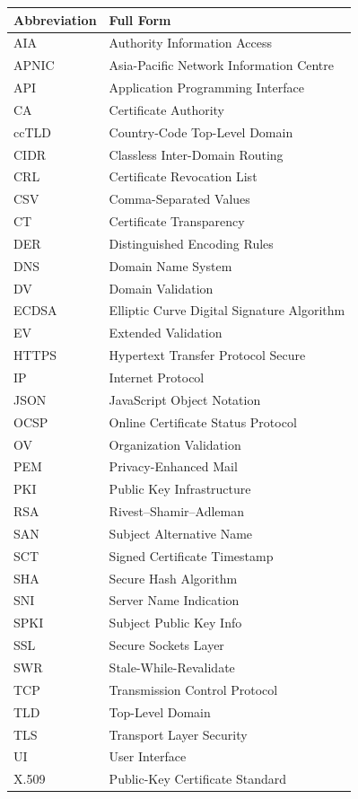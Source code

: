\clearpage
{}
{}

\begingroup
\singlespacing
\setlength{\LTpre}{0pt}
\setlength{\LTpost}{0pt}
\renewcommand{\arraystretch}{1.25}
\begin{longtable}{@{}p{}p{}@{}}
\toprule
\textbf{Abbreviation} & \textbf{Full Form} \\
\midrule
AIA & Authority Information Access \\
APNIC & Asia-Pacific Network Information Centre \\
API & Application Programming Interface \\
CA & Certificate Authority \\
ccTLD & Country-Code Top-Level Domain \\
CIDR & Classless Inter-Domain Routing \\
CRL & Certificate Revocation List \\
CSV & Comma-Separated Values \\
CT & Certificate Transparency \\
DER & Distinguished Encoding Rules \\
DNS & Domain Name System \\
DV & Domain Validation \\
ECDSA & Elliptic Curve Digital Signature Algorithm \\
EV & Extended Validation \\
HTTPS & Hypertext Transfer Protocol Secure \\
IP & Internet Protocol \\
JSON & JavaScript Object Notation \\
OCSP & Online Certificate Status Protocol \\
OV & Organization Validation \\
PEM & Privacy-Enhanced Mail \\
PKI & Public Key Infrastructure \\
RSA & Rivest--Shamir--Adleman \\
SAN & Subject Alternative Name \\
SCT & Signed Certificate Timestamp \\
SHA & Secure Hash Algorithm \\
SNI & Server Name Indication \\
SPKI & Subject Public Key Info \\
SSL & Secure Sockets Layer \\
SWR & Stale-While-Revalidate \\
TCP & Transmission Control Protocol \\
TLD & Top-Level Domain \\
TLS & Transport Layer Security \\
UI & User Interface \\
X.509 & Public-Key Certificate Standard \\
\bottomrule
\end{longtable}
\endgroup

\clearpage
